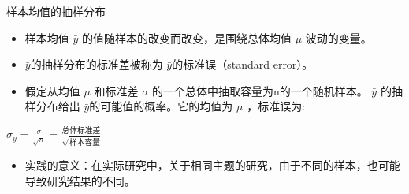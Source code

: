 \documentclass[presentation]{beamer}
\begin{document}
\begin{frame}[label={sec:org4f0fb05}]{样本均值的抽样分布}
\begin{itemize}
\item 样本均值 \(\bar y\) 的值随样本的改变而改变，是围绕总体均值 \(\mu\) 波动的变量。
\item \(\bar y\)的抽样分布的标准差被称为 \(\bar y\)的标准误（standard error）。
\item 假定从均值 \(\mu\) 和标准差 \(\sigma\) 的一个总体中抽取容量为n的一个随机样本。 \(\bar y\) 的抽样分布给出 \(\bar y\)的可能值的概率。它的均值为 \(\mu\) ，标准误为:
\end{itemize}
\(\sigma_{\bar y}=\frac{\sigma}{\sqrt n}=\frac{总体标准差}{\sqrt{样本容量}}\)   
\begin{itemize}
\item 实践的意义：在实际研究中，关于相同主题的研究，由于不同的样本，也可能导致研究结果的不同。
\end{itemize}
\end{frame}
\end{document}
